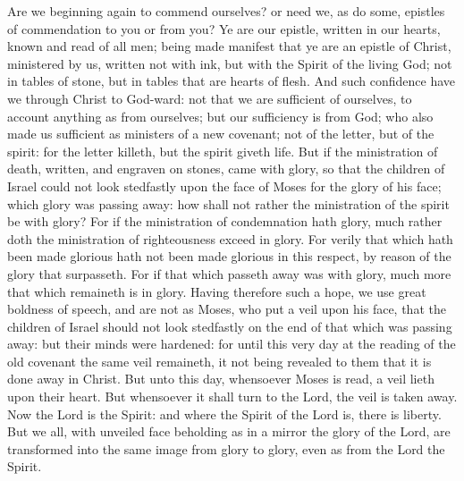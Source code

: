 Are we beginning again to commend ourselves? or need we, as do some, epistles of commendation to you or from you? Ye are our epistle, written in our hearts, known and read of all men; being made manifest that ye are an epistle of Christ, ministered by us, written not with ink, but with the Spirit of the living God; not in tables of stone, but in tables that are hearts of flesh. And such confidence have we through Christ to God-ward: not that we are sufficient of ourselves, to account anything as from ourselves; but our sufficiency is from God; who also made us sufficient as ministers of a new covenant; not of the letter, but of the spirit: for the letter killeth, but the spirit giveth life. But if the ministration of death, written, and engraven on stones, came with glory, so that the children of Israel could not look stedfastly upon the face of Moses for the glory of his face; which glory was passing away: how shall not rather the ministration of the spirit be with glory? For if the ministration of condemnation hath glory, much rather doth the ministration of righteousness exceed in glory. For verily that which hath been made glorious hath not been made glorious in this respect, by reason of the glory that surpasseth. For if that which passeth away was with glory, much more that which remaineth is in glory.  Having therefore such a hope, we use great boldness of speech, and are not as Moses, who put a veil upon his face, that the children of Israel should not look stedfastly on the end of that which was passing away: but their minds were hardened: for until this very day at the reading of the old covenant the same veil remaineth, it not being revealed to them that it is done away in Christ. But unto this day, whensoever Moses is read, a veil lieth upon their heart. But whensoever it shall turn to the Lord, the veil is taken away. Now the Lord is the Spirit: and where the Spirit of the Lord is, there is liberty. But we all, with unveiled face beholding as in a mirror the glory of the Lord, are transformed into the same image from glory to glory, even as from the Lord the Spirit. 

